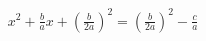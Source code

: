 \documentclass[preview]{standalone}
\begin{document}
\begin{align*}
x^2 + \frac{b}{a}x + \left(\frac{b}{2a}\right)^2 = \left(\frac{b}{2a}\right)^2 - \frac{c}{a}
\end{align*}
\end{document}
